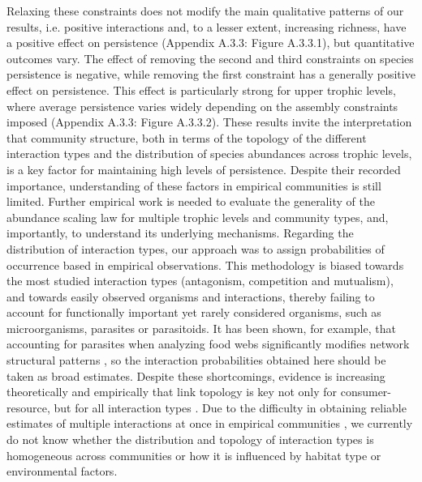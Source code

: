 Relaxing these constraints does not modify the main qualitative patterns of our results, i.e. positive interactions and, to a lesser extent, increasing richness, have a positive effect on persistence (Appendix A.3.3: Figure A.3.3.1), but quantitative outcomes vary. The effect of removing the second and third constraints on species persistence is negative, while removing the first constraint has a generally positive effect on persistence. This effect is particularly strong for upper trophic levels, where average persistence varies widely depending on the assembly constraints imposed (Appendix A.3.3: Figure A.3.3.2). These results invite the interpretation that community structure, both in terms of the topology of the different interaction types and the distribution of species abundances across trophic levels, is a key factor for maintaining high levels of persistence. Despite their recorded importance, understanding of these factors in empirical communities is still limited. Further empirical work is needed to evaluate the generality of the abundance scaling law \citep{Hatton2015} for multiple trophic levels and community types, and, importantly, to understand its underlying mechanisms. Regarding the distribution of interaction types, our approach was to assign probabilities of occurrence based in empirical observations. This methodology is biased towards the most studied interaction types (antagonism, competition and mutualism), and towards easily observed organisms and interactions, thereby failing to account for functionally important yet rarely considered organisms, such as microorganisms, parasites or parasitoids. It has been shown, for example, that accounting for parasites when analyzing food webs significantly modifies network structural patterns \citep{Lafferty2006}, so the interaction probabilities obtained here should be taken as broad estimates. Despite these shortcomings, evidence is increasing theoretically and empirically that link topology is key not only for consumer-resource, but for all interaction types \citep{Pocock2012,Evans2013a,Kefi2015,Kefi2016a,Sauve2016}. Due to the difficulty in obtaining reliable estimates of multiple interactions at once in empirical communities \citep{Garcia-Callejas2018}, we currently do not know whether the distribution and topology of interaction types is homogeneous across communities or how it is influenced by habitat type or environmental factors.

